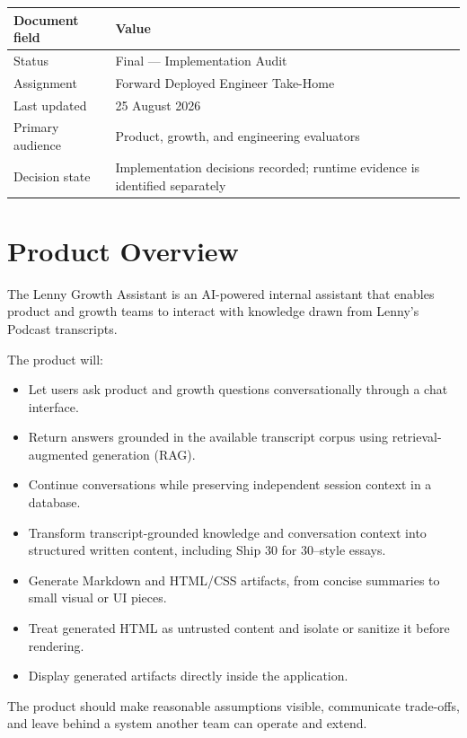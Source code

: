 \documentclass[11pt]{article}
\begin{document}
\begin{tabularx}{\textwidth}{@{}L{1.55in}Y@{}}
\toprule
\textbf{Document field} & \textbf{Value} \\
\midrule
Status & Final — Implementation Audit \\
Assignment & Forward Deployed Engineer Take-Home \\
Last updated & 25 August 2026 \\
Primary audience & Product, growth, and engineering evaluators \\
Decision state & Implementation decisions recorded; runtime evidence is identified separately \\
\bottomrule
\end{tabularx}

\vspace{1em}
\tableofcontents
\newpage

\section{Product Overview}

The Lenny Growth Assistant is an AI-powered internal assistant that enables product and growth teams to interact with knowledge drawn from Lenny's Podcast transcripts.

The product will:
\begin{itemize}
  \item Let users ask product and growth questions conversationally through a chat interface.
  \item Return answers grounded in the available transcript corpus using retrieval-augmented generation (RAG).
  \item Continue conversations while preserving independent session context in a database.
  \item Transform transcript-grounded knowledge and conversation context into structured written content, including Ship 30 for 30--style essays.
  \item Generate Markdown and HTML/CSS artifacts, from concise summaries to small visual or UI pieces.
  \item Treat generated HTML as untrusted content and isolate or sanitize it before rendering.
  \item Display generated artifacts directly inside the application.
\end{itemize}

The product should make reasonable assumptions visible, communicate trade-offs, and leave behind a system another team can operate and extend.
\end{document}
